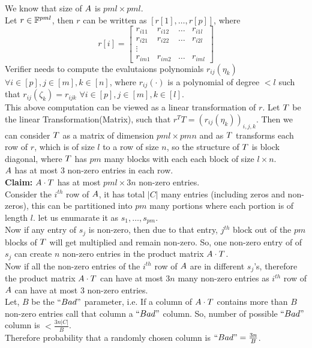 We know that size of $A$ is $pml \times pml$.\\
Let $r\in {\mathbb F}^{pml}$, then $r$ can be written as $[r[1],\ldots, r[p]]$,
where $$r[i]=
\begin{bmatrix}
r_{i11} & r_{i12} & \ldots & r_{i1l}\\
r_{i21} & r_{i22} & \ldots & r_{i2l}\\
\vdots\\
r_{im1} & r_{im2} & \ldots & r_{iml}
\end{bmatrix}
$$
Verifier needs to compute the evalutaions polynomials $r_{ij}(\eta_k)$ $\forall i\in [p], j\in [m], k\in [n]$, where $r_{ij}(\cdot)$ is a polynomial of degree $<l$ such that $r_{ij}(\zeta_k)=r_{ijk}$ $\forall i\in [p],j\in [m],k\in [l]$.\\
This above computation can be viewed as a linear transformation of $r$. Let $T$ be the linear Transformation(Matrix), such that $r^TT=(r_{ij}(\eta_k))_{i,j,k}$.
Then we can consider $T$ as a matrix of dimension $pml\times pmn$ and as $T$ transforms each row of $r$, which is of size $l$ to a row of size $n$, so the structure of $T$ is block diagonal, where $T$ has $pm$ many blocks with each each block of size $l\times n$.\\
$A$ has at most 3 non-zero entries in each row.\\
\textbf{Claim:} $A\cdot T$ has at most $pml \times 3n$ non-zero entries.\\
Consider the $i^{th}$ row of $A$, it has total $|C|$ many entries (including zeros and non-zeros), this can be partitioned into $pm$ many portions where each portion is of length $l$. let us enumarate it as $s_1,\ldots, s_{pm}$.\\
Now if any entry of $s_j$ is non-zero, then due to that entry, $j^{th}$ block out of the $pm$ blocks of $T$ will get multiplied and remain non-zero. So, one non-zero entry of of $s_j$ can create $n$ non-zero entries in the product matrix $A\cdot T$.\\
Now if all the non-zero entries of the $i^{th}$ row of $A$ are in different $s_j$'s, therefore the product matrix $A\cdot T$ can have at most $3n$ many non-zero entries as $i^{th}$ row of $A$ can have at most 3 non-zero entries.\\
Let, $B$ be the $``Bad"$ parameter, i.e. If a column of $A\cdot T$ contains more than $B$ non-zero entries call that column a $``Bad"$ column. So, number of possible $``Bad"$ column is $< \frac{3n|C|}{B}$.\\
Therefore probability that a randomly chosen column is $``Bad"= \frac{3n}{B}$.\\
